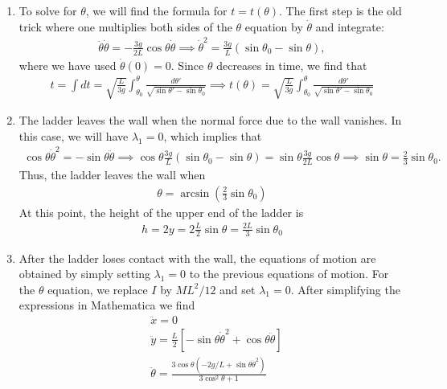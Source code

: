 \documentclass{article}
\theoremstyle{definition}
\newcommand{\f}[2]{\frac{#1}{#2}}
\newcommand{\lp}{\left(}
\newcommand{\rp}{\right)}
\newcommand{\lb}{\left[}
\newcommand{\rb}{\right]}
\begin{document}
\begin{enumerate}[label = (\alph*)]
		\item To solve for $\theta$, we will find the formula for $t=t(\theta)$. The first step is the old trick where one multiplies both sides of the $\theta$ equation by $\dot\theta$ and integrate: 
		\begin{align*}
		\ddot\theta \dot \theta = -\f{3g}{2L}\cos\theta \dot\theta \implies \dot\theta^2 = \f{3g}{L}(\sin\theta_0-\sin\theta),
		\end{align*}
		where we have used $\dot\theta(0) = 0$. Since $\theta$ decreases in time, we find that
		\begin{align*}
		t = \int dt = \sqrt{\f{L}{3g}}\int_{\theta_0}^{\theta} \f{d\theta'}{\sqrt{\sin\theta'-\sin\theta_0}} \implies \boxed{t(\theta) = \sqrt{\f{L}{3g}}\int_{\theta_0}^{\theta} \f{d\theta'}{\sqrt{\sin\theta'-\sin\theta_0}}}
		\end{align*}
		
		\item The ladder leaves the wall when the normal force due to the wall vanishes. In this case, we will have $\lambda_1 = 0$, which implies that
		\begin{align*}
		\cos\theta \dot\theta^2 = -\sin\theta\ddot\theta \implies \cos\theta \f{3g}{L}(\sin\theta_0-\sin\theta) = \sin\theta \f{3g}{2L}\cos\theta \implies \sin\theta = \f{2}{3}\sin\theta_0.
		\end{align*}
		Thus, the ladder leaves the wall when 
		\begin{align*}
		\boxed{\theta = \arcsin\lp \f{2}{3}\sin\theta_0 \rp}
		\end{align*}
		At this point, the height of the upper end of the ladder is 
		\begin{align*}
		h = 2y = 2\f{L}{2} \sin\theta = \boxed{\f{2L}{3}\sin\theta_0}
		\end{align*}
		
		\item After the ladder loses contact with the wall, the equations of motion are obtained by simply setting $\lambda_1 =0$ to the previous equations of motion. For the $\theta$ equation, we replace $I$ by $ML^2/12$ and set $\lambda_1 = 0$. After simplifying the expressions in Mathematica we find 
		\begin{align*}
		&\boxed{\ddot{x} = 0}\\
		&\boxed{\ddot{y} = \f{L}{2}\lb -\sin\theta \dot\theta^2 + \cos\theta \ddot\theta \rb  }\\
		&\boxed{\ddot\theta= \frac{3\cos \theta \left(-2g/L + \sin\theta \dot\theta^2\right)}{ 3\cos^2\theta+1}}
		\end{align*}
		

\end{enumerate}
\end{document}
